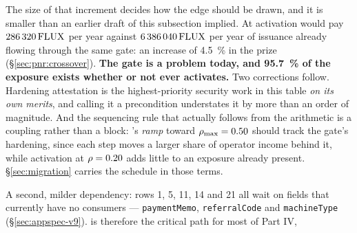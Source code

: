 The size of that increment decides how the edge should be drawn, and it is smaller than an earlier
draft of this subsection implied. At activation \PNR{} would pay $\num{286320}\,\mathrm{FLUX}$ per year against
$\num{6386040}\,\mathrm{FLUX}$ per year of issuance already flowing through the same gate: an increase of
\SI{4.5}{\percent} in the prize (\S\ref{sec:pnr:crossover}). \textbf{The gate is a \PoN{} problem
today, and \SI{95.7}{\percent} of the exposure exists whether or not \PNR{} ever activates.} Two
corrections follow. Hardening attestation is the highest-priority security work in this table
\emph{on its own merits}, and calling it a \PNR{} precondition understates it by more than an order of
magnitude. And the sequencing rule that actually follows from the arithmetic is a coupling rather than
a block: \PNR{}'s \emph{ramp} toward $\rho_{\max} = 0.50$ should track the gate's hardening, since
each step moves a larger share of operator income behind it, while activation at
$\rho = 0.20$ adds little to an exposure already present. \S\ref{sec:migration} carries the
schedule in those terms.

A second, milder dependency: rows 1, 5, 11, 14 and 21 all wait on  fields that currently have
no consumers --- \texttt{paymentMemo}, \texttt{referralCode} and \texttt{machineType}
(\S\ref{sec:appspec-v9}).  is therefore the critical path for most of Part IV, 

\FloatBarrier
